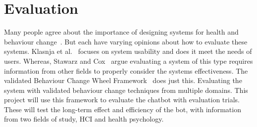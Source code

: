 
\newpage
\section{Evaluation}

Many people agree about the importance of designing systems for health and behaviour change~\cite{article_mhealth, article_designing_for_healthy_lifestyles, article_designing_for_health_behaviour_change_hci}. But each have varying opinions about how to evaluate these systems. Klasnja et al.~\cite{article_evaluate_tech_health_behaviour_change} focuses on system usability and does it meet the needs of users. Whereas, Stawarz and Cox~\cite{article_designing_for_health_behaviour_change_hci} argue evaluating a system of this type requires information from other fields to properly consider the systems effectiveness. The validated Behaviour Change Wheel Framework~\cite{article_behaviour_change_wheel} does just this. Evaluating the system with validated behaviour change techniques from multiple domains. This project will use this framework to evaluate the chatbot with evaluation trials. These will test the long-term effect and efficiency of the bot, with information from two fields of study, HCI and health psychology.

